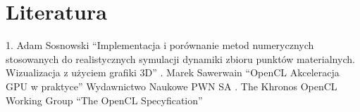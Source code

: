 \pagebreak
\section{Literatura}

1. Adam Sosnowski ``Implementacja i porównanie metod numerycznych stosowanych do realistycznych symulacji dynamiki zbioru punktów materialnych. Wizualizacja z użyciem grafiki 3D'' . Marek Sawerwain ``OpenCL Akceleracja GPU w praktyce'' Wydawnictwo Naukowe PWN SA . The Khronos OpenCL Working Group ``The OpenCL Specyfication'' \linebreak

